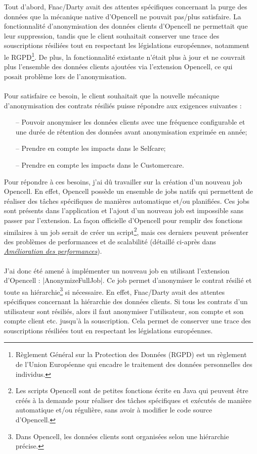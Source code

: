 \documentclass[12pt, a4paper]{report}
\begin{document}
	Tout d'abord, Fnac/Darty avait des attentes spécifiques concernant la purge des données que la mécanique native d'Opencell ne pouvait pas/plus satisfaire. La fonctionnalité d'anonymisation des données clients d'Opencell ne permettait que leur suppression, tandis que le client souhaitait conserver une trace des souscriptions résiliées tout en respectant les législations européennes, notamment le RGPD\footnote{Règlement Général sur la Protection des Données (RGPD) est un règlement de l'Union Européenne qui encadre le traitement des données personnelles des individus.}. De plus, la fonctionnalité existante n'était plus à jour et ne couvrait plus l'ensemble des données clients ajoutées via l'extension Opencell, ce qui posait problème lors de l'anonymisation.
	\\\\
	Pour satisfaire ce besoin, le client souhaitait que la nouvelle mécanique d'anonymisation des contrats résiliés puisse répondre aux exigences suivantes :
	\\
	\begin{itemize}
		\item[–] Pouvoir anonymiser les données clients avec une fréquence configurable et une durée de rétention des données avant anonymisation exprimée en année;
		\item[–] Prendre en compte les impacts dans le Selfcare;
		\item[–] Prendre en compte les impacts dans le Customercare.
	\end{itemize}
	\vspace{.5cm}

	\noindent
	Pour répondre à ces besoins, j'ai dû travailler sur la création d'un nouveau job Opencell. En effet, Opencell possède un ensemble de jobs natifs qui permettent de réaliser des tâches spécifiques de manières automatique et/ou planifiées. Ces jobs sont présents dans l'application et l'ajout d'un nouveau job est impossible sans passer par l'extension. La façon \flqq{} officielle \frqq{} d'Opencell pour remplir des fonctions similaires à un job serait de créer un script\footnote{Les scripts Opencell sont de petites fonctions écrite en Java qui peuvent être créés à la demande pour réaliser des tâches spécifiques et exécutés de manière automatique et/ou régulière, sans avoir à modifier le code source d'Opencell.}, mais ces derniers peuvent présenter des problèmes de performances et de scalabilité (détaillé ci-après dans \hyperref[s:amelioration_performances]{\it{Amélioration des performances}}).
	\\\\
	J'ai donc été amené à implémenter un nouveau job en utilisant l'extension d'Opencell : \cverb|AnonymizeFullJob|. Ce job permet d'anonymiser le contrat résilié et toute sa hiérarchie\footnote{Dans Opencell, les données clients sont organisées selon une hiérarchie précise.} si nécessaire. En effet, Fnac/Darty avait des attentes spécifiques concernant la hiérarchie des données clients. Si tous les contrats d'un utilisateur sont résiliés, alors il faut anonymiser l'utilisateur, son compte et son compte client etc. jusqu'à la souscription. Cela permet de conserver une trace des souscriptions résiliées tout en respectant les législations européennes.
	
\end{document}
